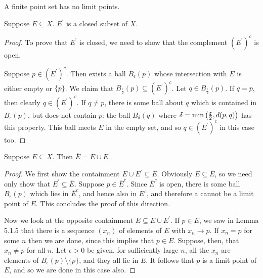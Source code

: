\begin{corollary}
A finite point set has no limit points.
\end{corollary}

\begin{proposition}
Suppose $E\subseteq X$. $E^\prime$ is a closed subset of $X$.
\end{proposition}

\begin{proof}
To prove that $E^\prime$ is closed, we need to show that the complement $(E^\prime)^c$ is open.

Suppose $p\in (E^\prime)^c$. Then exists a ball $B_\epsilon(p)$ whose intersection with $E$ is either empty or $\{p\}$. We claim that $B_\frac{\epsilon}{2}(p)\subseteq (E^\prime)^c$. Let $q\in B_\frac{\epsilon}{2}(p)$. If $q=p$, then clearly $q\in (E^\prime)^c$. If $q\neq p$, there is some ball about $q$ which is contained in $B_\epsilon(p)$, but does not contain $p$: the ball $B_\delta(q)$ where $\delta=\min\left(\frac{\varepsilon}{2},d(p,q)\right)$ has this property. This ball meets $E$ in the empty set, and so $q\in (E^\prime)^c$ in this case too.
\end{proof}

\begin{proposition}
Suppose $E\subseteq X$. Then $\overline{E}=E\cup E^\prime$.
\end{proposition}

\begin{proof}
We first show the containment $E\cup E^\prime\subseteq\overline{E}$. Obviously $E\subseteq\overline{E}$, so we need only show that $E^\prime\subseteq\overline{E}$. Suppose $p\in\overline{E}^c$. Since $\overline{E}^c$ is open, there is some ball $B_\epsilon(p)$ which lies in $\overline{E}^c$, and hence also in $E^c$, and therefore a cannot be a limit point of $E$. This concludes the proof of this direction.

Now we look at the opposite containment $\overline{E}\subseteq E\cup E^\prime$. If $p\in\overline{E}$, we saw in Lemma 5.1.5 that there is a sequence  $(x_n)$ of elements of $E$ with $x_n\to p$. If $x_n=p$ for some $n$ then we are done, since this implies that $p\in E$. Suppose, then, that $x_n\neq p$ for all $n$. Let $\epsilon>0$ be given, for sufficiently large $n$, all the $x_n$ are elements of $B_\epsilon(p)\setminus\{p\}$, and they all lie in $E$. It follows that $p$ is a limit point of $E$, and so we are done in this case also.
\end{proof}

